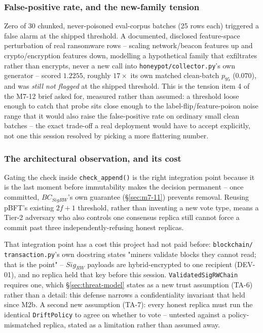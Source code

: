 \documentclass[conference]{IEEEtran}
\begin{document}
\subsubsection{False-positive rate, and the new-family tension}

Zero of 30 chunked, never-poisoned eval-corpus batches (25 rows each) triggered a false alarm at
the shipped threshold. A documented, disclosed feature-space perturbation of real ransomware rows
-- scaling network/beacon features up and crypto/encryption features down, modelling a
hypothetical family that exfiltrates rather than encrypts, never a new call into
\texttt{honeypot/collector.py}'s own generator -- scored $1.2255$, roughly $17\times$ its own
matched clean-batch $p_{95}$ ($0.070$), and was \emph{still not flagged} at the shipped threshold.
This is the tension item 4 of the M7-12 brief asked for, measured rather than assumed: a threshold
loose enough to catch that probe sits close enough to the label-flip/feature-poison noise range
that it would also raise the false-positive rate on ordinary small clean batches -- the exact
trade-off a real deployment would have to accept explicitly, not one this session resolved by
picking a more flattering number.

\subsubsection{The architectural observation, and its cost}

Gating the check inside \texttt{check\_append()} is the right integration point because it is the
last moment before immutability makes the decision permanent -- once committed, $BC_{SigRW}$'s own
guarantee (\S\ref{sec:m7-11}) prevents removal. Reusing pBFT's existing $2f{+}1$ threshold, rather
than inventing a new vote type, means a Tier-2 adversary who also controls one consensus replica
still cannot force a commit past three independently-refusing honest replicas.

That integration point has a cost this project had not paid before: \texttt{blockchain/
transaction.py}'s own docstring states "miners validate blocks they cannot read; that is the
point" -- $Sig_{RW}$ payloads are hybrid-encrypted to one recipient (DEV-01), and no replica held
that key before this session. \texttt{ValidatedSigRWChain} requires one, which
\S\ref{sec:threat-model} states as a new trust assumption (TA-6) rather than a detail: this
defense narrows a confidentiality invariant that held since M2b. A second new assumption (TA-7):
every honest replica must run the identical \texttt{DriftPolicy} to agree on whether to vote --
untested against a policy-mismatched replica, stated as a limitation rather than assumed away.
\end{document}
